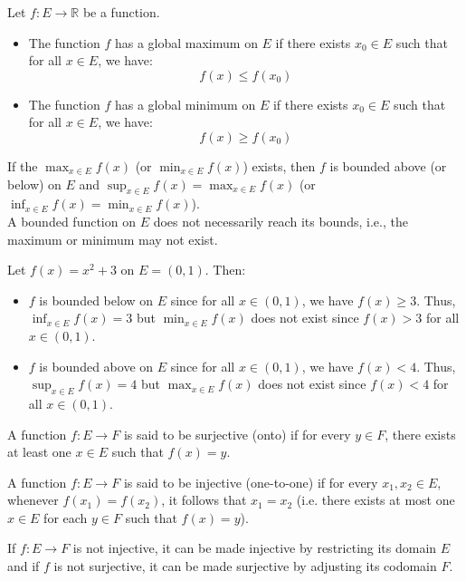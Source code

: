 \begin{definition}
    Let $f : E \to \mathbb{R}$ be a function.
    \begin{itemize}[itemsep=1pt,label=$\circ$]
        \item The function $f$ has a global maximum on $E$ if there exists $x_0 \in E$ such that for all $x \in E$, we have:
        \[
            f(x) \leq f(x_0)
        \]
        \item The function $f$ has a global minimum on $E$ if there exists $x_0 \in E$ such that for all $x \in E$, we have:
        \[
            f(x) \geq f(x_0)
        \]
    \end{itemize}
\end{definition}
If the $\max_{x \in E} f(x)$ (or $\min_{x \in E} f(x)$) exists, then $f$ is bounded above (or below) on $E$ and $\sup_{x \in E} f(x) = \max_{x \in E} f(x)$ (or $\inf_{x \in E} f(x) = \min_{x \in E} f(x)$). \\
A bounded function on $E$ does not necessarily reach its bounds, i.e., the maximum or minimum may not exist.
\begin{eg}
    Let $f(x) = x^2 + 3$ on $E = (0, 1)$. Then:
    \begin{itemize}[itemsep=1pt,label=$\circ$]
        \item $f$ is bounded below on $E$ since for all $x \in (0, 1)$, we have $f(x) \geq 3$. Thus, $\inf_{x \in E} f(x) = 3$ but $\min_{x \in E} f(x)$ does not exist since $f(x) > 3$ for all $x \in (0, 1)$.
        \item $f$ is bounded above on $E$ since for all $x \in (0, 1)$, we have $f(x) < 4$. Thus, $\sup_{x \in E} f(x) = 4$ but $\max_{x \in E} f(x)$ does not exist since $f(x) < 4$ for all $x \in (0, 1)$.
    \end{itemize}
\end{eg}

\begin{definition}[Surjectivity]
    A function $f : E \to F$ is said to be surjective (onto) if for every $y \in F$, there exists at least one $x \in E$ such that $f(x) = y$.
\end{definition}
\begin{definition}[Injectivity]
    A function $f : E \to F$ is said to be injective (one-to-one) if for every $x_1, x_2 \in E$, whenever $f(x_1) = f(x_2)$, it follows that $x_1 = x_2$ (i.e. there exists at most one $x \in E$ for each $y \in F$ such that $f(x) = y$).
\end{definition}
If $f: E \to F$ is not injective, it can be made injective by restricting its domain $E$ and if $f$ is not surjective, it can be made surjective by adjusting its codomain $F$.


